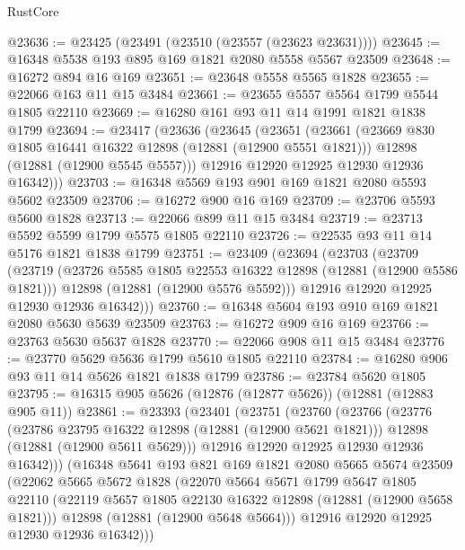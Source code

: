 \begin{lexlean}{RustCore}
\begin{coremodule}
@23636 := @23425 (@23491 (@23510 (@23557 (@23623 @23631))))
@23645 := @16348 @5538 @193 @895 @169 @1821 @2080 @5558 @5567 @23509
@23648 := @16272 @894 @16 @169
@23651 := @23648 @5558 @5565 @1828
@23655 := @22066 @163 @11 @15 @3484
@23661 := @23655 @5557 @5564 @1799 @5544 @1805 @22110
@23669 := @16280 @161 @93 @11 @14 @1991 @1821 @1838 @1799
@23694 := @23417
    (@23636
      (@23645
        (@23651
          (@23661
            (@23669 @830 @1805 @16441 @16322 @12898 (@12881 (@12900 @5551 @1821)))
            @12898
            (@12881 (@12900 @5545 @5557)))
          @12916
          @12920
          @12925
          @12930
          @12936
          @16342)))
@23703 := @16348 @5569 @193 @901 @169 @1821 @2080 @5593 @5602 @23509
@23706 := @16272 @900 @16 @169
@23709 := @23706 @5593 @5600 @1828
@23713 := @22066 @899 @11 @15 @3484
@23719 := @23713 @5592 @5599 @1799 @5575 @1805 @22110
@23726 := @22535 @93 @11 @14 @5176 @1821 @1838 @1799
@23751 := @23409
    (@23694
      (@23703
        (@23709
          (@23719
            (@23726 @5585 @1805 @22553 @16322 @12898 (@12881 (@12900 @5586 @1821)))
            @12898
            (@12881 (@12900 @5576 @5592)))
          @12916
          @12920
          @12925
          @12930
          @12936
          @16342)))
@23760 := @16348 @5604 @193 @910 @169 @1821 @2080 @5630 @5639 @23509
@23763 := @16272 @909 @16 @169
@23766 := @23763 @5630 @5637 @1828
@23770 := @22066 @908 @11 @15 @3484
@23776 := @23770 @5629 @5636 @1799 @5610 @1805 @22110
@23784 := @16280 @906 @93 @11 @14 @5626 @1821 @1838 @1799
@23786 := @23784 @5620 @1805
@23795 := @16315 @905 @5626 (@12876 (@12877 @5626)) (@12881 (@12883 @905 @11))
@23861 := @23393
    (@23401
      (@23751
        (@23760
          (@23766
            (@23776
              (@23786 @23795 @16322 @12898 (@12881 (@12900 @5621 @1821)))
              @12898
              (@12881 (@12900 @5611 @5629)))
            @12916
            @12920
            @12925
            @12930
            @12936
            @16342)))
      (@16348
        @5641
        @193
        @821
        @169
        @1821
        @2080
        @5665
        @5674
        @23509
        (@22062
          @5665
          @5672
          @1828
          (@22070
            @5664
            @5671
            @1799
            @5647
            @1805
            @22110
            (@22119 @5657 @1805 @22130 @16322 @12898 (@12881 (@12900 @5658 @1821)))
            @12898
            (@12881 (@12900 @5648 @5664)))
          @12916
          @12920
          @12925
          @12930
          @12936
          @16342)))

\end{coremodule}
\end{lexlean}
